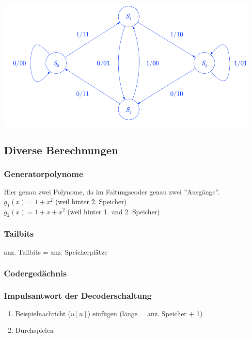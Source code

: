 \vspace{-8pt}
\begin{center}
    \includegraphics[width=\linewidth]{graphic/faltungscodes/Zustandsdiagramm.png}
\end{center}
\vspace{-8pt}



\subsection{Diverse Berechnungen}

\subsubsection{Generatorpolynome}
Hier genau zwei Polynome, da im Faltungscoder genau zwei ''Ausgänge''.\\
$g_1(x) = 1 + x^2$ (weil hinter 2. Speicher)\\
$g_2(x) = 1 + x + x^2$ (weil hinter 1. und 2. Speicher)

\subsubsection{Tailbits}
anz. Tailbits = anz. Speicherplätze

\subsubsection{Codergedächnis}

\subsubsection{Impulsantwort der Decoderschaltung}
\begin{enumerate}
    \item Beispielnachricht (${u[n]}$) einfügen (länge = anz. Speicher + 1)
    \item Durchspielen
\end{enumerate}

